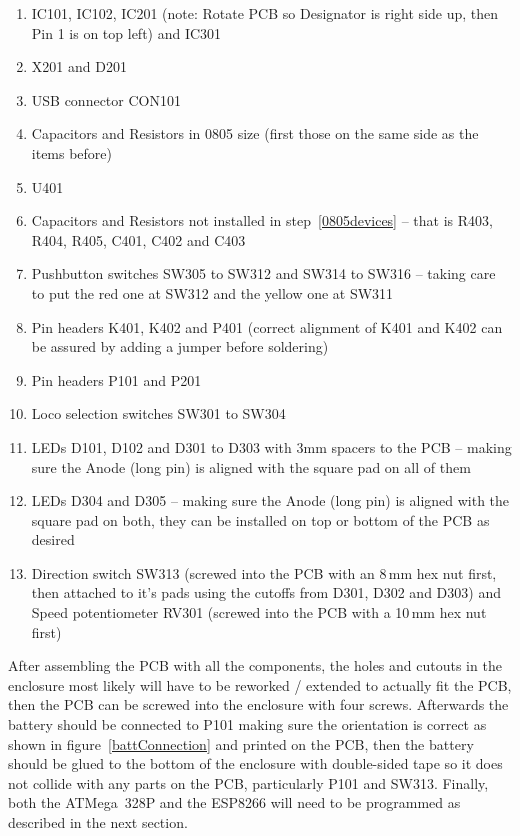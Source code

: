 \documentclass[11pt,a4paper]{scrartcl}
\begin{document}
\begin{enumerate}
\item IC101, IC102, IC201 (note: Rotate PCB so Designator is right side up, then Pin 1 is on top left) and IC301
\item X201 and D201
\item USB connector CON101
\item Capacitors and Resistors in 0805 size (first those on the same side as the items before) \label{0805devices}
\item U401
\item Capacitors and Resistors not installed in step~\ref{0805devices} -- that is R403, R404, R405, C401, C402 and C403
\item Pushbutton switches SW305 to SW312 and SW314 to SW316 -- taking care to put the red one at SW312 and the yellow one at SW311
\item Pin headers K401, K402 and P401 (correct alignment of K401 and K402 can be assured by adding a jumper before soldering)
\item Pin headers P101 and P201
\item Loco selection switches SW301 to SW304
\item LEDs D101, D102 and D301 to D303 with 3mm spacers to the PCB -- making sure the Anode (long pin) is aligned with the square pad on all of them
\item LEDs D304 and D305 -- making sure the Anode (long pin) is aligned with the square pad on both, they can be installed on top or bottom of the PCB as desired
\item Direction switch SW313 (screwed into the PCB with an 8\,mm hex nut first, then attached to it's pads using the cutoffs from D301, D302 and D303) and Speed potentiometer RV301 (screwed into the PCB with a 10\,mm hex nut first)
\end{enumerate}

After assembling the PCB with all the components, the holes and cutouts in the enclosure most likely will have to be reworked / extended to actually fit the PCB, then the PCB can be screwed into the enclosure with four screws. Afterwards the battery should be connected to P101 making sure the orientation is correct as shown in figure~\ref{battConnection} and printed on the PCB, then the battery should be glued to the bottom of the enclosure with double-sided tape so it does not collide with any parts on the PCB, particularly P101 and SW313. Finally, both the ATMega~328P and the ESP8266 will need to be programmed as described in the next section.
\end{document}
